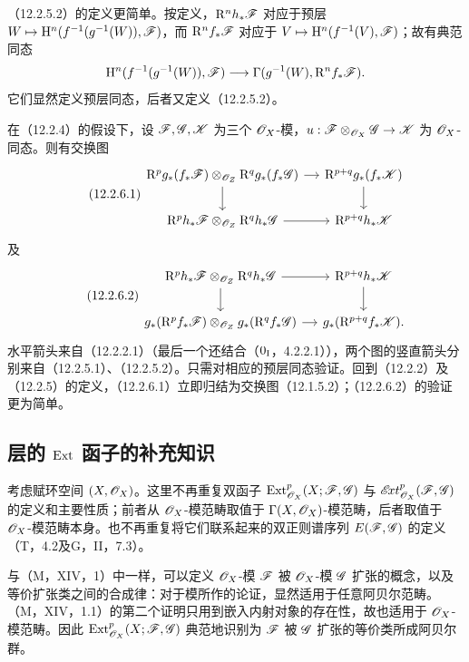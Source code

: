 （12.2.5.2）的定义更简单。按定义，$\mathrm R^nh_*\mathscr F$ 对应于预层 $W\mapsto\mathrm H^n(f^{-1}(g^{-1}(W)),\mathscr F)$，而 $\mathrm R^nf_*\mathscr F$ 对应于 $V\mapsto\mathrm H^n(f^{-1}(V),\mathscr F)$；故有典范同态
\[
\mathrm H^n(f^{-1}(g^{-1}(W)),\mathscr F)
\longrightarrow\Gamma(g^{-1}(W),\mathrm R^nf_*\mathscr F).
\]
它们显然定义预层同态，后者又定义（12.2.5.2）。

在（12.2.4）的假设下，设 $\mathscr F,\mathscr G,\mathscr K$ 为三个 $\mathscr O_X$-模，$u:\mathscr F\otimes_{\mathscr O_X}\mathscr G\to\mathscr K$ 为 $\mathscr O_X$-同态。则有交换图
\begin{equation}\tag{12.2.6.1}
\begin{tikzcd}[column sep=small]
\mathrm R^pg_*(f_*\F)\otimes_{\OO_Z}\mathrm R^qg_*(f_*\G)\arrow[r]\arrow[d]&\mathrm R^{p+q}g_*(f_*\K)\arrow[d]\\
\mathrm R^ph_*\F\otimes_{\OO_Z}\mathrm R^qh_*\G\arrow[r]&\mathrm R^{p+q}h_*\K
\end{tikzcd}
\end{equation}
及
\begin{equation}\tag{12.2.6.2}
\begin{tikzcd}[column sep=small]
\mathrm R^ph_*\F\otimes_{\OO_Z}\mathrm R^qh_*\G\arrow[r]\arrow[d]&\mathrm R^{p+q}h_*\K\arrow[d]\\
g_*(\mathrm R^pf_*\F)\otimes_{\OO_Z}g_*(\mathrm R^qf_*\G)\arrow[r]&g_*(\mathrm R^{p+q}f_*\K).
\end{tikzcd}
\end{equation}
水平箭头来自（12.2.2.1）（最后一个还结合（$0_{\mathrm I}$，4.2.2.1）），两个图的竖直箭头分别来自（12.2.5.1）、（12.2.5.2）。只需对相应的预层同态验证。回到（12.2.2）及（12.2.5）的定义，（12.2.6.1）立即归结为交换图（12.1.5.2）；（12.2.6.2）的验证更为简单。

\subsection{层的 \texorpdfstring{$\operatorname{Ext}$}{Ext} 函子的补充知识}
考虑赋环空间 $(X,\mathscr O_X)$。这里不再重复双函子 $\operatorname{Ext}^p_{\mathscr O_X}(X;\mathscr F,\mathscr G)$ 与 $\mathscr{E}\!xt^p_{\mathscr O_X}(\mathscr F,\mathscr G)$ 的定义和主要性质；前者从 $\mathscr O_X$-模范畴取值于 $\Gamma(X,\mathscr O_X)$-模范畴，后者取值于 $\mathscr O_X$-模范畴本身。也不再重复将它们联系起来的双正则谱序列 $E(\mathscr F,\mathscr G)$ 的定义（T，4.2及G，II，7.3）。

与（M，XIV，1）中一样，可以定义 $\mathscr O_X$-模 $\mathscr F$ 被 $\mathscr O_X$-模 $\mathscr G$ 扩张的概念，以及等价扩张类之间的合成律：对于模所作的论证，显然适用于任意阿贝尔范畴。（M，XIV，1.1）的第二个证明只用到嵌入内射对象的存在性，故也适用于 $\mathscr O_X$-模范畴。因此 $\operatorname{Ext}^p_{\mathscr O_X}(X;\mathscr F,\mathscr G)$ 典范地识别为 $\mathscr F$ 被 $\mathscr G$ 扩张的等价类所成阿贝尔群。

